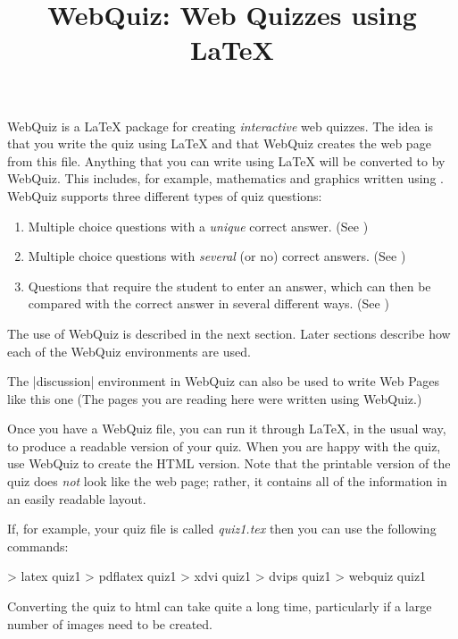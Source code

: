 \documentclass[svgnames]{webquiz}
\title{WebQuiz: Web Quizzes using LaTeX}
\newcommand\WebQuiz{WebQuiz\xspace}
\begin{document}
\begin{discussion}[Introduction]
  \WebQuiz is a \LaTeX{} package for creating \textit{interactive}
  web quizzes.  The idea is that you write the quiz using \LaTeX{} and that
  \WebQuiz creates the web page from this file. Anything that you can
  write using \LaTeX{} will be converted to \HTML by \WebQuiz. This
  includes, for example, mathematics and graphics written using
  .  \WebQuiz supports three different types of quiz
  questions:

  \begin{enumerate}
  \item Multiple choice questions with a \emph{unique} correct answer.
 (See )
  \item Multiple choice questions with \emph{several} (or no)
    correct answers.
 (See )
  \item Questions that require the student to enter an answer, which
  can then be compared with the correct answer in several different
  ways. (See )
  \end{enumerate}
The use of \WebQuiz is described in the next section. Later
sections describe how each of the \WebQuiz environments are used.

The \LaTeXCode|discussion| environment in \WebQuiz can also be used to
write Web Pages like this one (The pages you are reading here were
written using \WebQuiz.)
\end{discussion}
\begin{discussion}
Once you have a \WebQuiz file, you can run it through \LaTeX, in
the usual way, to produce a readable version of your quiz. When you
are happy with the quiz, use \WebQuiz to create the HTML
version. Note that the printable version of the quiz does \emph{not}
look like the web page; rather, it contains all of the information in
an easily readable layout.

  If, for example, your quiz file is called \emph{quiz1.tex} then you
  can use the following commands:
\begin{latexcode}
      > latex quiz1             %
      > pdflatex quiz1          %
      > xdvi quiz1              %
      > dvips quiz1             %
      > webquiz quiz1           %
\end{latexcode}
  Converting the quiz to html can take quite a long time, particularly
  if a large number of images need to be created.

\end{discussion}
\end{document}
